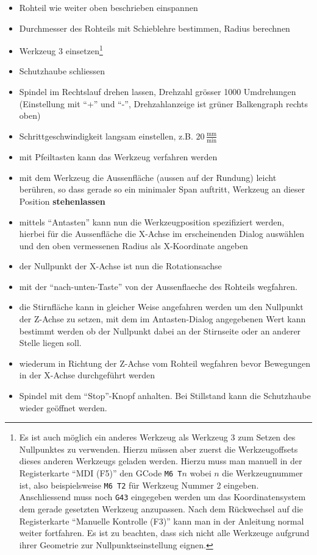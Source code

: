 \documentclass{\basedir/fablab-document}
\begin{document}
\begin{itemize}
	\item Rohteil wie weiter oben beschrieben einspannen
	\item Durchmesser des Rohteils mit Schieblehre bestimmen, Radius berechnen
	\item Werkzeug 3 einsetzen\footnote{Es ist auch möglich ein anderes Werkzeug als Werkzeug 3 zum Setzen des Nullpunktes zu verwenden. Hierzu müssen aber zuerst die Werkzeugoffsets dieses anderen Werkzeugs geladen werden. Hierzu muss man manuell in der Registerkarte \enquote{MDI (F5)} den GCode \texttt{M6 T$n$} wobei $n$ die Werkzeugnummer ist, also beispielsweise \texttt{M6 T2} für Werkzeug Nummer 2 eingeben. Anschliessend muss noch \texttt{G43} eingegeben werden um das Koordinatensystem dem gerade gesetzten Werkzeug anzupassen. Nach dem Rückwechsel auf die Registerkarte \enquote{Manuelle Kontrolle (F3)} kann man in der Anleitung normal weiter fortfahren. Es ist zu beachten, dass sich nicht alle Werkzeuge aufgrund ihrer Geometrie zur Nullpunktseinstellung eignen.}
	\item Schutzhaube schliessen
	\item Spindel im Rechtslauf drehen lassen, Drehzahl grösser 1000 Umdrehungen (Einstellung mit \enquote{+} und \enquote{-}, Drehzahlanzeige ist grüner Balkengraph rechts oben)
	\item Schrittgeschwindigkeit langsam einstellen, z.B. $20\,\frac{\mathrm{mm}}{\mathrm{min}}$
	\item mit Pfeiltasten kann das Werkzeug verfahren werden
	\item mit dem Werkzeug die Aussenfläche (aussen auf der Rundung) leicht berühren, so dass gerade so ein minimaler Span auftritt, Werkzeug an dieser Position \textbf{stehenlassen}
	\item mittels \enquote{Antasten} kann nun die Werkzeugposition spezifiziert werden, hierbei für die Aussenfläche die X-Achse im erscheinenden Dialog auswählen und den oben vermessenen Radius als X-Koordinate angeben
	\item der Nullpunkt der X-Achse ist nun die Rotationsachse
	\item mit der \enquote{nach-unten-Taste} von der Aussenflaeche des Rohteils wegfahren.
	\item die Stirnfläche kann in gleicher Weise angefahren werden um den Nullpunkt der Z-Achse zu setzen, mit dem im Antasten-Dialog angegebenen Wert kann bestimmt werden ob der Nullpunkt dabei an der Stirnseite oder an anderer Stelle liegen soll.
	\item wiederum in Richtung der Z-Achse vom Rohteil wegfahren bevor Bewegungen in der X-Achse durchgeführt werden
	\item Spindel mit dem \enquote{Stop}-Knopf anhalten. Bei Stillstand kann die Schutzhaube wieder geöffnet werden.
\end{itemize}
\end{document}
